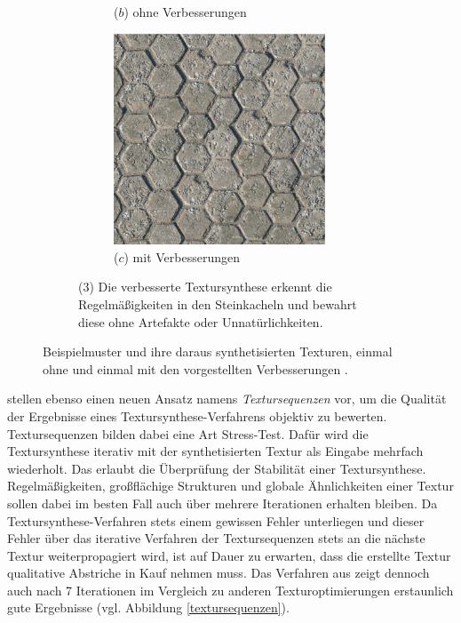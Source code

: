 \begin{figure}
\begin{subfigure}{0.9\textwidth}
\begin{subfigure}{0.3\textwidth}
		\caption*{($b$) ohne Verbesserungen}
	\end{subfigure}
	\hfill
	\begin{subfigure}{0.3\textwidth}
		\centering
		\includegraphics[width=0.9\textwidth]{images/example-3-with}
		\caption*{($c$) mit Verbesserungen}
	\end{subfigure}
	
	\caption*{($3$) Die verbesserte Textursynthese erkennt die Regelmäßigkeiten in den Steinkacheln und bewahrt diese ohne Artefakte oder Unnatürlichkeiten.}
\end{subfigure}

\label{examples}
\caption{Beispielmuster und ihre daraus synthetisierten Texturen, einmal ohne und einmal mit den vorgestellten Verbesserungen \cite{SelfTuning}.}
\end{figure}

\cite{SelfTuning} stellen ebenso einen neuen Ansatz namens \emph{Textursequenzen} vor, um die Qualität der Ergebnisse eines Textursynthese-Verfahrens objektiv zu bewerten.
Textursequenzen bilden dabei eine Art \glqq Stress-Test\grqq.
Dafür wird die Textursynthese iterativ mit der synthetisierten Textur als Eingabe mehrfach wiederholt.
Das erlaubt die Überprüfung der Stabilität einer Textursynthese.
Regelmäßigkeiten, großflächige Strukturen und globale Ähnlichkeiten einer Textur sollen dabei im besten Fall auch über mehrere Iterationen erhalten bleiben.
Da Textursynthese-Verfahren stets einem gewissen Fehler unterliegen und dieser Fehler über das iterative Verfahren der Textursequenzen stets an die nächste Textur weiterpropagiert wird, ist auf Dauer zu erwarten, dass die erstellte Textur qualitative Abstriche in Kauf nehmen muss.
Das Verfahren aus \cite{SelfTuning} zeigt dennoch auch nach 7 Iterationen im Vergleich zu anderen Texturoptimierungen erstaunlich gute Ergebnisse (vgl. Abbildung \ref{textursequenzen}).

